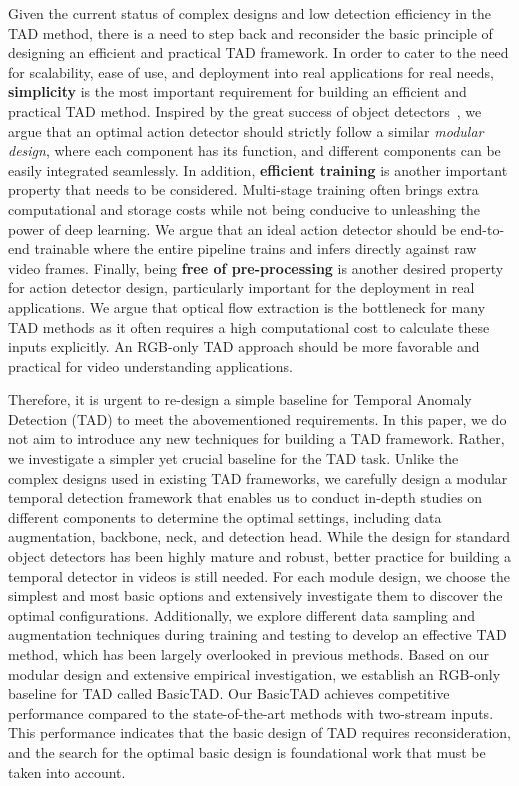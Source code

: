 \documentclass[a4paper,fleqn]{cas-dc}
\begin{document}
Given the current status of complex designs and low detection efficiency in the TAD method, there is a need to step back and reconsider the basic principle of designing an efficient and practical TAD framework. In order to cater to the need for scalability, ease of use, and deployment into real applications for real needs, {\bf simplicity} is the most important requirement for building an efficient and practical TAD method. Inspired by the great success of object detectors~\citep{focalloss,fcos}, we argue that an optimal action detector should strictly follow a similar {\em modular design}, where each component has its function, and different components can be easily integrated seamlessly. In addition, {\bf efficient training} is another important property that needs to be considered. Multi-stage training often brings extra computational and storage costs while not being conducive to unleashing the power of deep learning. We argue that an ideal action detector should be end-to-end trainable where the entire pipeline trains and infers directly against raw video frames. Finally, being {\bf free of pre-processing} is another desired property for action detector design, particularly important for the deployment in real applications. We argue that optical flow extraction is the bottleneck for many TAD methods as it often requires a high computational cost to calculate these inputs explicitly. An RGB-only TAD approach should be more favorable and practical for video understanding applications.

Therefore, it is urgent to re-design a simple baseline for Temporal Anomaly Detection (TAD) to meet the abovementioned requirements. In this paper, we do not aim to introduce any new techniques for building a TAD framework. Rather, we investigate a simpler yet crucial baseline for the TAD task. Unlike the complex designs used in existing TAD frameworks, we carefully design a modular temporal detection framework that enables us to conduct in-depth studies on different components to determine the optimal settings, including data augmentation, backbone, neck, and detection head. While the design for standard object detectors has been highly mature and robust, better practice for building a temporal detector in videos is still needed. For each module design, we choose the simplest and most basic options and extensively investigate them to discover the optimal configurations. Additionally, we explore different data sampling and augmentation techniques during training and testing to develop an effective TAD method, which has been largely overlooked in previous methods. Based on our modular design and extensive empirical investigation, we establish an RGB-only baseline for TAD called BasicTAD. Our BasicTAD achieves competitive performance compared to the state-of-the-art methods with two-stream inputs. This performance indicates that the basic design of TAD requires reconsideration, and the search for the optimal basic design is foundational work that must be taken into account.
\end{document}

